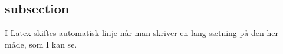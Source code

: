 \begin{flushleft} %

\subsection{subsection}

I Latex skiftes automatisk linje når man skriver en lang sætning på den her måde, som I kan se.

\addlinespace %



\end{flushleft}
